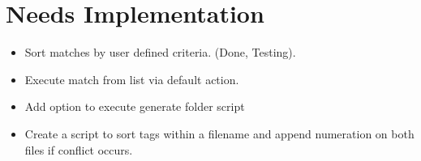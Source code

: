 \documentclass[12pt]{article}
\begin{document}
\section{Needs Implementation}
\begin{itemize}
  \item Sort matches by user defined criteria. (Done, Testing).
  \item Execute match from list via default action.
  \item Add option to execute generate folder script
  \item Create a script to sort tags within a filename and append numeration on both files if conflict occurs.
\end{itemize}


\end{document}
